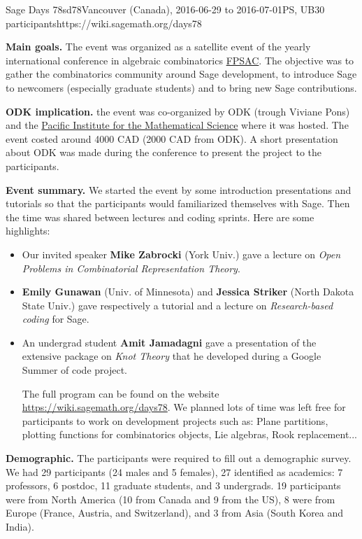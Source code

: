 \begin{event}{Sage Days 78}{sd78}{Vancouver (Canada), 2016-06-29 to 2016-07-01}{PS, UB}{30 participants}{https://wiki.sagemath.org/days78}

\textbf{Main goals.} The event was organized as a satellite event of the yearly international conference
in algebraic combinatorics \href{https://sites.google.com/site/fpsac2016/}{FPSAC}. The objective was to gather
the combinatorics community around Sage development, to introduce Sage to newcomers (especially graduate students) and
to bring new Sage contributions.

\textbf{ODK implication.} the event was co-organized by ODK (trough Viviane Pons) and the 
\href{https://www.pims.math.ca/}{Pacific Institute for the Mathematical Science} where
it was hosted. The event costed around 4000 CAD (2000 CAD from ODK).
 A short presentation about ODK was made during the conference to present 
the project to the participants.

\textbf{Event summary.} We started the event by some introduction presentations and tutorials so that
the participants would familiarized themselves with Sage. Then the time was shared between lectures
and coding sprints. Here are some highlights:
\begin{itemize}
\item Our invited speaker \textbf{Mike Zabrocki} (York Univ.) gave a lecture on \emph{Open Problems in Combinatorial Representation Theory}.

\item \textbf{Emily Gunawan} (Univ. of Minnesota) and \textbf{Jessica Striker} (North Dakota State Univ.) gave respectively
a tutorial and a lecture on \emph{Research-based coding} for Sage.

\item An undergrad student \textbf{Amit Jamadagni} gave a presentation of the extensive package on \emph{Knot Theory} that
he developed during a Google Summer of code project.

The full program can be found on the website \url{https://wiki.sagemath.org/days78}. We planned lots of time was left 
free for participants to work on development projects such as: Plane partitions, plotting functions for combinatorics
objects, Lie algebras, Rook replacement...
\end{itemize}

\textbf{Demographic.} The participants were required to fill out a demographic survey. We had 29 participants (24 males and
5 females), 27 identified as academics: 7 professors, 6 postdoc, 11 graduate students, and 3 undergrads. 19 participants
were from North America (10 from Canada and 9 from the US), 8 were from Europe (France, Austria, and Switzerland), and 3 from 
Asia (South Korea and India).


\end{event}

